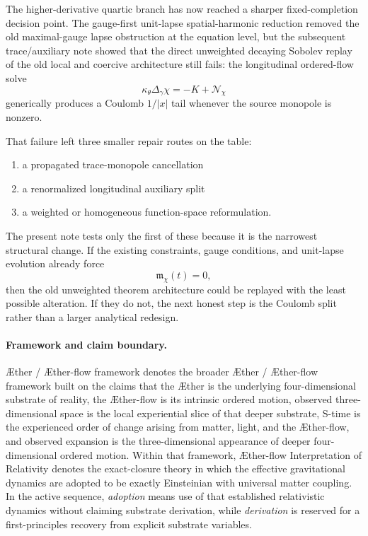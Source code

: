 \documentclass[11pt]{article}
\newcommand{\Aether}{\AE{}ther}
\newcommand{\Aflow}{\AE{}ther-flow}
\newcommand{\TheoryName}{\Aflow{} Interpretation of Relativity}
\newcommand{\TheoryProgram}{\Aether{} / \Aflow{} framework}
\begin{document}
The higher-derivative quartic branch has now reached a sharper fixed-completion decision point. The gauge-first unit-lapse spatial-harmonic reduction removed the old maximal-gauge lapse obstruction at the equation level, but the subsequent trace/auxiliary note showed that the direct unweighted decaying Sobolev replay of the old local and coercive architecture still fails: the longitudinal ordered-flow solve
\begin{equation}
\kappa_\theta \Delta_\gamma \chi
=
-K+\mathcal N_\chi
\label{eq:chiell}
\end{equation}
generically produces a Coulomb \(1/|x|\) tail whenever the source monopole is nonzero.

That failure left three smaller repair routes on the table:
\begin{enumerate}
    \item a propagated trace-monopole cancellation
    \item a renormalized longitudinal auxiliary split
    \item a weighted or homogeneous function-space reformulation.
\end{enumerate}
The present note tests only the first of these because it is the narrowest structural change. If the existing constraints, gauge conditions, and unit-lapse evolution already force
\[
\mathfrak m_\chi(t)=0,
\]
then the old unweighted theorem architecture could be replayed with the least possible alteration. If they do not, the next honest step is the Coulomb split rather than a larger analytical redesign.

\paragraph{Framework and claim boundary.}
\TheoryProgram{} denotes the broader \Aether{} / \Aflow{} framework built on the claims that the \Aether{} is the underlying four-dimensional substrate of reality, the \Aflow{} is its intrinsic ordered motion, observed three-dimensional space is the local experiential slice of that deeper substrate, S-time is the experienced order of change arising from matter, light, and the \Aflow{}, and observed expansion is the three-dimensional appearance of deeper four-dimensional ordered motion. Within that framework, \TheoryName{} denotes the exact-closure theory in which the effective gravitational dynamics are adopted to be exactly Einsteinian with universal matter coupling. In the active sequence, \emph{adoption} means use of that established relativistic dynamics without claiming substrate derivation, while \emph{derivation} is reserved for a first-principles recovery from explicit substrate variables.
\end{document}
